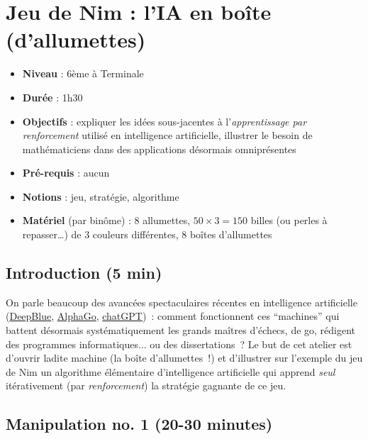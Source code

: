 \documentclass[a4paper,12pt]{article}
\title{}
\author[1]{Jean-Baptiste Caillau}
\author[1]{Christophe Cazanave}
\author[1]{Marc Monticelli}
\affil{Université Côte d’Azur, CNRS, LJAD, France}
\date{}
\begin{document}
\maketitle




\section*{Jeu de Nim : l'IA en boîte (d'allumettes)}
\label{jeu-de-nim-lia-en-bouxeete-dallumettes}

\begin{itemize}
\item
  \textbf{Niveau} : 6ème à Terminale
\item
  \textbf{Durée} : 1h30
\item
  \textbf{Objectifs} : expliquer les idées sous-jacentes à l'\emph{apprentissage par renforcement} utilisé en intelligence artificielle, illustrer le besoin de mathématiciens dans des applications désormais omniprésentes
\item
  \textbf{Pré-requis} : aucun
\item
  \textbf{Notions} : jeu, stratégie, algorithme
\item
  \textbf{Matériel} (par binôme) : 8 allumettes, $50 \times 3 = 150$ billes (ou perles à repasser\ldots) de 3 couleurs différentes, 8 boîtes d'allumettes
\end{itemize}


\subsection*{Introduction (5 min)}
\label{introduction-5-min}


On parle beaucoup des avancées spectaculaires récentes en intelligence artificielle (\href{https://www.ibm.com/ibm/history/ibm100/us/en/icons/deepblue}{DeepBlue}, \href{https://www.deepmind.com/research/highlighted-research}{AlphaGo}, \href{https://openai.com/blog/chatgpt}{chatGPT})~: comment fonctionnent ces ``machines'' qui battent désormais systématiquement les grands maîtres d'échecs, de go, rédigent des programmes informatiques... ou des dissertations~? Le but de cet atelier est d'ouvrir ladite machine (la boîte d'allumettes~!) et d'illustrer sur l'exemple du jeu de Nim un algorithme élémentaire d'intelligence artificielle qui apprend \emph{seul} itérativement (par \emph{renforcement}) la stratégie gagnante de ce jeu.


\subsection*{Manipulation no. 1 (20-30 minutes)}
\label{manipulation-no.-1-20-30-minutes}
\end{document}
